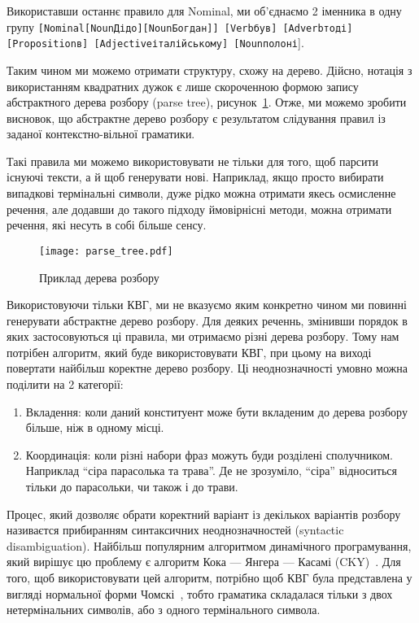 Використавши останнє правило для Nominal, ми об'єднаємо
2 іменника в одну групу 
\texttt{[{\footnotesize Nominal}[{\footnotesize Noun}Дідо][{\footnotesize Noun}Богдан]]
[{\footnotesize Verb}був] [{\footnotesize Adverb}тоді] [{\footnotesize Proposition}в]
[{\footnotesize Adjective}італійському] [{\footnotesize Noun}полоні}].

Таким чином ми можемо отримати структуру, схожу на дерево. Дійсно, нотація з використанням
квадратних дужок є лише скороченною формою запису
абстрактного дерева розбору (parse tree), рисунок~\ref{text:parse_tree}.
Отже, ми можемо зробити висновок, що абстрактне дерево розбору є результатом слідування
правил із заданої контекстно-вільної граматики. 

Такі правила ми можемо використовувати не
тільки для того, щоб парсити існуючі тексти, а й щоб генерувати нові. Наприклад, якщо
просто вибирати випадкові термінальні символи, дуже рідко можна отримати якесь осмисленне
речення, але додавши до такого підходу ймовірнісні методи, можна отримати речення, які
несуть в собі більше сенсу.

\begin{figure}[H]
  \centering
  \texttt{[image: parse\_tree.pdf]} 
  \caption{Приклад дерева розбору}
  \label{text:parse_tree}
\end{figure}

Використовуючи тільки КВГ, ми не вказуємо яким конкретно чином ми повинні генерувати
абстрактне дерево розбору. Для деяких реченнь, змінивши порядок в яких застосовуються ці
правила, ми отримаємо різні дерева розбору. Тому нам потрібен алгоритм, який буде 
використовувати КВГ, при цьому на виході повертати найбільш коректне дерево розбору.
Ці неоднозначності умовно можна поділити на 2 категорії:
\begin{enumerate}
    \item Вкладення: коли даний конституент може бути вкладеним до дерева розбору
    більше, ніж в одному місці.
    \item Координація: коли різні набори фраз можуть буди розділені сполучником.
    Наприклад ``сіра парасолька та трава''. Де не зрозуміло, ``сіра'' відноситься
    тільки до парасольки, чи також і до трави.
\end{enumerate}

Процес, який дозволяє обрати коректний варіант із декількох варіантів розбору називаєтся
прибиранням синтаксичних неоднозначностей (syntactic disambiguation). Найбільш
популярним алгоритмом динамічного програмування, який вирішує цю проблему є
алгоритм Кока — Янгера — Касамі (CKY)~\cite{bib6}. Для того, щоб
використовувати цей алгоритм, потрібно щоб КВГ була представлена у вигляді
нормальної форми Чомскі~\cite{bib7}, тобто граматика складалася тільки
з двох нетермінальних символів, або з одного термінального символа.

